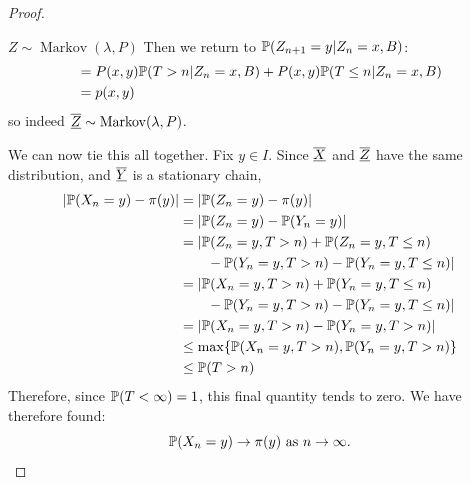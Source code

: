 \documentclass[../Main.tex]{subfiles}
\begin{document}
\begin{proof}
\begin{subproof}{$Z \sim \operatorname{Markov}(\lambda, P)$}
        Then we return to $\P(Z_{n+1} = y | Z_n = x, B)$:
        \begin{align*}
            &=P(x, y) \P(T > n | Z_n = x, B) + P(x, y) \P(T \leq n | Z_n = x, B) \\
            &= p(x, y)
        \end{align*}
        so indeed $\chain{Z} \sim \operatorname{Markov}(\lambda, P)$.
    \end{subproof}
    We can now tie this all together. Fix $y \in I$. Since $\chain{X}$ and $\chain{Z}$ have the same distribution, and $\chain{Y}$ is a stationary chain,
    \begin{align*}
        |\P(X_n = y) - \pi(y)| &= |\P(Z_n = y) - \pi(y)| \\
        &= |\P(Z_n = y) - \P(Y_n = y)| \\
        &= |\P(Z_n = y, T > n) + \P(Z_n = y, T \leq n)\\
            &\qquad- \P(Y_n = y, T > n) - \P(Y_n = y, T \leq n)| \\
        &= |\P(X_n = y, T > n) + \P(Y_n = y, T \leq n)\\
            &\qquad- \P(Y_n = y, T > n) - \P(Y_n = y, T \leq n)| \\
        &= |\P(X_n = y, T > n) - \P(Y_n = y, T > n)| \\
        &\leq \max\{\P(X_n = y, T > n), \P(Y_n = y, T > n)\} \\
        &\leq \P(T > n)
    \end{align*}
    Therefore, since $\P(T < \infty) = 1$, this final quantity tends to zero. We have therefore found:
    \begin{equation*}
        \P(X_n = y) \to \pi(y) \text{ as $n \to \infty$.}
    \end{equation*}
\end{proof}
\end{document}
